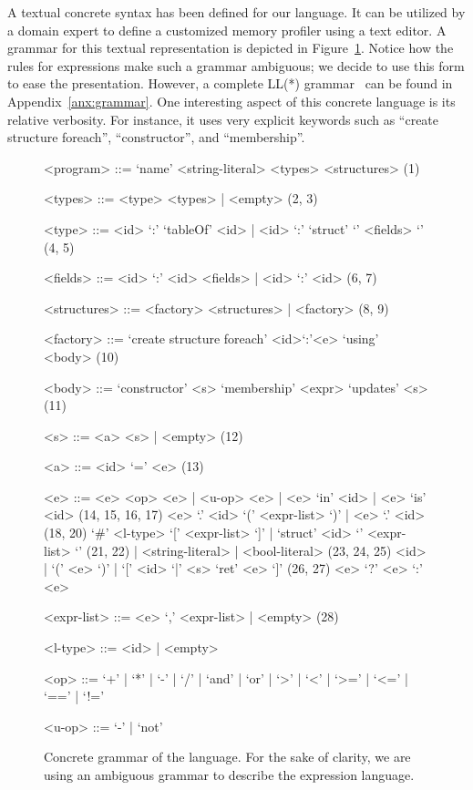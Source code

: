 A textual concrete syntax has been defined for our language.
It can be utilized by a domain expert to define a customized memory profiler using a text editor.
A grammar for this textual representation is depicted in Figure~\ref{fig:dsl-grammar}.
Notice how the rules for expressions make such a grammar ambiguous; we decide to use this form to ease the presentation.
However, a complete LL(*) grammar~\cite{Parr:2011:LFA:1993498.1993548} can be found in Appendix~\ref{anx:grammar}.
One interesting aspect of this concrete language is its relative verbosity.
For instance, it uses very explicit keywords such as ``create structure foreach'', ``constructor'', and ``membership''.


{
\scriptsize
\begin{figure}[!ht]
\begin{mdframed}[outermargin=0.2cm, innermargin=0.5cm]

\newcommand{\grule}[1]{\hfill{\scriptsize (#1)}}
\setlength{\grammarindent}{4em}
\begin{grammar}

<program> ::=  `name' <string-literal> <types> <structures> \grule{1}

<types> ::= <type> <types> | <empty> \grule{2, 3}

<type> ::= <id> `:' `tableOf' <id> | <id> `:' `struct' `{' <fields> `}' \grule{4, 5}

<fields> ::= <id> `:' <id> <fields> | <id> `:' <id> \grule{6, 7}

<structures> ::= <factory> <structures> | <factory> \grule{8, 9}

<factory> ::= `create structure foreach' <id>`:'<e> `using' <body> \grule{10}

<body> ::= `constructor' <s> `membership' <expr> `updates' <s> \grule{11}

<s> ::= <a> <s> | <empty> \grule{12}

<a> ::= <id> `=' <e>  \grule{13} 

<e> ::= <e> <op> <e> | <u-op> <e> | <e> `in' <id> | <e> `is' <id> \grule{14, 15, 16, 17}
\alt <e> `.' <id> `(' <expr-list> `)' | <e> `.' <id> \grule{18, 20}
\alt `#' <l-type> `[' <expr-list> `]' | `struct' <id> `{' <expr-list> `}' \grule{21, 22}
 | <string-literal> | <bool-literal> \grule{23, 24, 25}
\alt <id> | `(' <e> `)' | `[' <id> `|' <s> `ret' <e> `]' \grule{26, 27}
\alt <e> `?' <e> `:' <e>

<expr-list> ::= <e> `,' <expr-list> | <empty>  \grule{28}

<l-type> ::= <id> | <empty>

<op> ::= `+' | `*' | `-' | `/' | `and' | `or' | `>' | `<' | `>=' | `<=' | `==' | `!='

<u-op> ::= `-' | `not'

\end{grammar}
\end{mdframed}
\caption{Concrete grammar of the language. For the sake of clarity, we are using an ambiguous grammar to describe the expression language.} \label{fig:dsl-grammar}
\end{figure}
}


